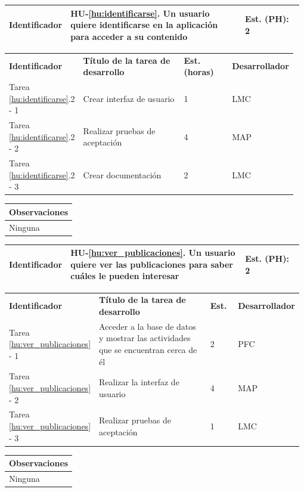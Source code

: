 \documentclass[11pt]{article}
\begin{document}
\begin{longtable}{p{0.18\linewidth}|p{0.6\linewidth}|p{0.2\linewidth}}
  \rowcolor{LightCyan}
  \textbf{Identificador} & \textbf{HU-\ref{hu:identificarse}}. Un usuario quiere identificarse en la aplicación para acceder a su contenido & \textbf{Est. (PH):} 2 \\
  \bottomrule
\end{longtable}
\vspace{-0.5cm}
\begin{longtable}{p{0.18\linewidth}|p{0.4\linewidth}|p{0.18\linewidth}|p{0.2\linewidth}}
  \toprule
  \textbf{Identificador} & \textbf{Título de la tarea de desarrollo} & \textbf{Est. (horas)} & \textbf{Desarrollador} \\
  Tarea \ref{hu:identificarse}.2 - 1 & Crear interfaz de usuario & 1 & LMC\\
  Tarea \ref{hu:identificarse}.2 - 2 & Realizar pruebas de aceptación & 4 & MAP\\
  Tarea \ref{hu:identificarse}.2 - 3 & Crear documentación & 2 & LMC\\
  \bottomrule
\end{longtable}
\vspace{-0.5cm}
\begin{longtable}{p{1.028\linewidth}}
  \textbf{Observaciones}\\
  \midrule
  Ninguna\\
  \bottomrule
\end{longtable}

\begin{longtable}{p{0.18\linewidth}|p{0.6\linewidth}|p{0.2\linewidth}}
  \rowcolor{LightCyan}
  \textbf{Identificador} & \textbf{HU-\ref{hu:ver_publicaciones}}. Un usuario quiere ver las publicaciones para saber cuáles le pueden interesar & \textbf{Est. (PH):} 2\\	
  \bottomrule
\end{longtable}
\vspace{-0.5cm}
\begin{longtable}{p{0.18\linewidth}|p{0.5\linewidth}|p{0.1\linewidth}|p{0.2\linewidth}}
  \toprule
  \textbf{Identificador} & \textbf{Título de la tarea de desarrollo} & \textbf{Est.} & \textbf{Desarrollador} \\
  Tarea \ref{hu:ver_publicaciones} - 1 & Acceder  a la base de datos y mostrar las actividades que se encuentran cerca de él & 2 & PFC\\
  Tarea \ref{hu:ver_publicaciones} - 2 & Realizar la interfaz de usuario & 4 & MAP\\
  Tarea \ref{hu:ver_publicaciones} - 3 & Realizar pruebas de aceptación & 1 & LMC\\
  \bottomrule
\end{longtable}
\vspace{-0.5cm}
\begin{longtable}{p{1.028\linewidth}}
  \textbf{Observaciones}\\
  \midrule
  Ninguna\\
  \bottomrule
\end{longtable}
\end{document}
